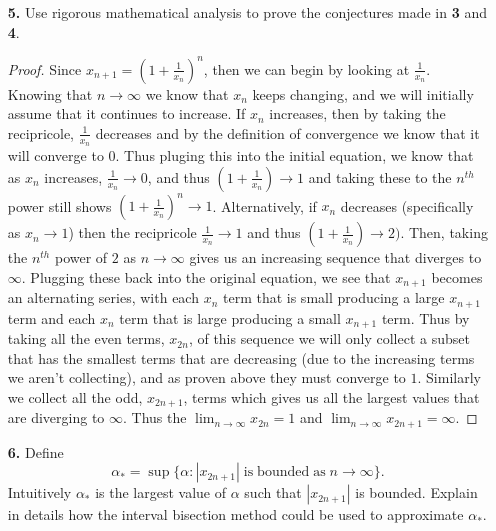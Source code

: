 \documentclass[ 12pt ]{article}
\begin{document}
\begin{enumerate}
	\item[\textbf{5.}] Use rigorous mathematical analysis to prove the conjectures made in \textbf{3} and \textbf{4}.

		\begin{proof}
			Since $x_{n+1}=(1+\frac{1}{x_n})^n$, then we can begin by looking at $\frac{1}{x_n}$. Knowing that $n\rightarrow\infty$ we know that $x_n$ keeps changing, and we will initially assume that it continues to increase. If $x_n$ increases, then by taking the recipricole, $\frac{1}{x_n}$ decreases and by the definition of convergence we know that it will converge to $0$. Thus pluging this into the initial equation, we know that as $x_n$ increases, $\frac{1}{x_n}\rightarrow0$, and thus $(1+\frac{1}{x_n})\rightarrow1$ and taking these to the $n^{th}$ power still shows $(1+\frac{1}{x_n})^n\rightarrow1$. Alternatively, if $x_n$ decreases (specifically as $x_n\rightarrow1$) then the recipricole $\frac{1}{x_n}\rightarrow1$ and thus $(1+\frac{1}{x_n})\rightarrow2)$. Then, taking the $n^{th}$ power of $2$ as $n\rightarrow\infty$ gives us an increasing sequence that diverges to $\infty$. Plugging these back into the original equation, we see that $x_{n+1}$ becomes an alternating series, with each $x_n$ term that is small producing a large $x_{n+1}$ term and each $x_n$ term that is large producing a small $x_{n+1}$ term. Thus by taking all the even terms, $x_{2n}$, of this sequence we will only collect a subset that has the smallest terms that are decreasing (due to the increasing terms we aren't collecting), and as proven above they must converge to $1$. Similarly we collect all the odd, $x_{2n+1}$, terms which gives us all the largest values that are diverging to $\infty$. Thus the $\lim_{n\rightarrow\infty}x_{2n}=1$ and $\lim_{n\rightarrow\infty}x_{2n+1}=\infty$.
		\end{proof}


	\item[\textbf{6.}] Define $$\alpha_* = \sup \{ \alpha : |x_{2n+1}|\; \mathrm{is\; bounded\; as}\; n \to \infty \}.$$ Intuitively $\alpha_*$ is the largest value of $\alpha$ such
		that $|x_{2n+1}|$ is bounded. Explain in details how the interval bisection method could be used to approximate $\alpha_*$.


\end{enumerate}
\end{document}
